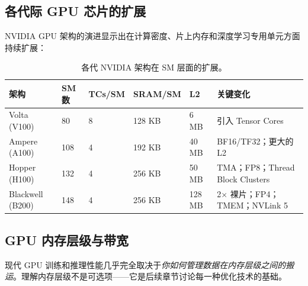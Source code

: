 \subsection{各代际 GPU 芯片的扩展}
\label{gpu-chip-scaling-across-generations}

NVIDIA GPU 架构的演进显示出在计算密度、片上内存和深度学习专用单元方面持续扩展：

\begin{table}[ht!]
\centering
\caption{各代 NVIDIA 架构在 SM 层面的扩展。}
\small
\noindent\begin{tabularx}{\linewidth}{@{}l l l l l Z{1}@{}}
\toprule
\textbf{架构} & \textbf{SM 数} & \textbf{TCs/SM} & \textbf{SRAM/SM} & \textbf{L2} & \textbf{关键变化} \\
\midrule
Volta (V100) & 80 & 8 & 128 KB & 6 MB & 引入 Tensor Cores \\
Ampere (A100) & 108 & 4 & 192 KB & 40 MB & BF16/TF32；更大的 L2 \\
Hopper (H100) & 132 & 4 & 256 KB & 50 MB & TMA；FP8；Thread Block Clusters \\
Blackwell (B200) & 148 & 4 & 256 KB & 128 MB & 2$\times$ 裸片；FP4；TMEM；NVLink 5 \\
\bottomrule
\end{tabularx}
\end{table}

\subsection{GPU 内存层级与带宽}
\label{gpu-memory-hierarchy-and-bandwidth}

现代 GPU 训练和推理性能几乎完全取决于\emph{你如何管理数据在内存层级之间的搬运}。理解内存层级不是可选项——它是后续章节讨论每一种优化技术的基础。


